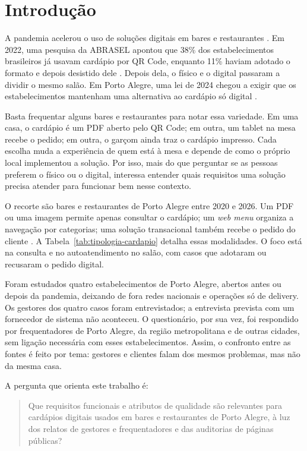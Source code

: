 \chapter{Introdução}
\label{ch:introducao}

A pandemia acelerou o uso de soluções digitais em bares e restaurantes \cite{costa2021implicacoes}. Em 2022, uma pesquisa da ABRASEL apontou que 38\% dos estabelecimentos brasileiros já usavam cardápio por QR Code, enquanto 11\% haviam adotado o formato e depois desistido dele \cite{abrasel2023qrcode}. Depois dela, o físico e o digital passaram a dividir o mesmo salão. Em Porto Alegre, uma lei de 2024 chegou a exigir que os estabelecimentos mantenham uma alternativa ao cardápio só digital \cite{camarapoa2024cardapio}.

Basta frequentar alguns bares e restaurantes para notar essa variedade. Em uma casa, o cardápio é um PDF aberto pelo QR Code; em outra, um tablet na mesa recebe o pedido; em outra, o garçom ainda traz o cardápio impresso. Cada escolha muda a experiência de quem está à mesa e depende de como o próprio local implementou a solução. Por isso, mais do que perguntar se as pessoas preferem o físico ou o digital, interessa entender quais requisitos uma solução precisa atender para funcionar bem nesse contexto.

O recorte são bares e restaurantes de Porto Alegre entre 2020 e 2026. Um PDF ou uma imagem permite apenas consultar o cardápio; um \emph{web menu} organiza a navegação por categorias; uma solução transacional também recebe o pedido do cliente \cite{chen2021consumer,santos2024gerador}. A Tabela~\ref{tab:tipologia-cardapio} detalha essas modalidades. O foco está na consulta e no autoatendimento no salão, com casos que adotaram ou recusaram o pedido digital.

Foram estudados quatro estabelecimentos de Porto Alegre, abertos antes ou depois da pandemia, deixando de fora redes nacionais e operações só de delivery. Os gestores dos quatro casos foram entrevistados; a entrevista prevista com um fornecedor de sistema não aconteceu. O questionário, por sua vez, foi respondido por frequentadores de Porto Alegre, da região metropolitana e de outras cidades, sem ligação necessária com esses estabelecimentos. Assim, o confronto entre as fontes é feito por tema: gestores e clientes falam dos mesmos problemas, mas não da mesma casa.

A pergunta que orienta este trabalho é:

\begin{quote}
Que requisitos funcionais e atributos de qualidade são relevantes para cardápios digitais usados em bares e restaurantes de Porto Alegre, à luz dos relatos de gestores e frequentadores e das auditorias de páginas públicas?
\end{quote}

